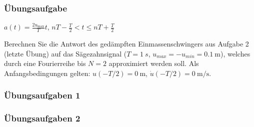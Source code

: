 \documentclass[hyperref={pdfpagemode=FullScreen, colorlinks=false}]{beamer}
\begin{document}

\begin{frame}
\frametitle{Übungsaufgabe}
$a(t)=\frac{2u_\mathrm{max}}{T}t$, \quad
$nT-\frac{T}{2} < t \le nT+\frac{T}{2}$
\hfill


\bigskip

Berechnen Sie die Antwort des gedämpften Einmassenschwingers aus Aufgabe 2 (letzte Übung) auf das Sägezahnsignal ($T=\SI{1}{s}$, $u_{max}=-u_{min}=\SI{0.1}{\metre}$), welches durch eine Fourierreihe bis $N=2$ approximiert werden soll.
Als Anfangsbedingungen gelten: $u(-T/2)=\SI{0}{\metre}$, $\dot{u}(-T/2)=\SI{0}{\metre\per\second}$.
\end{frame}


\begin{frame}
\frametitle{Übungsaufgaben 1}
 

 
\end{frame}

\begin{frame}
\frametitle{Übungsaufgaben 2}

\end{frame}
\end{document}
